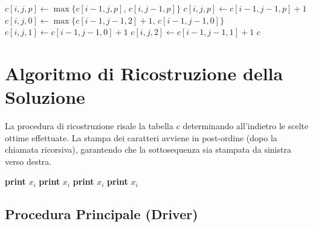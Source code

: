 \begin{algorithm}[H]
\begin{algorithmic}[1]
                \State $c[i, j, p] \gets \max\{ c[i-1, j, p], \, c[i, j-1, p] \}$
            \EndFor
        \Else {}
                    \State $c[i, j, p] \gets c[i-1, j-1, p] + 1$
                \EndFor
            \Else {}
                \State $c[i, j, 0] \gets \max\{ c[i-1, j-1, 2] + 1, \, c[i-1, j-1, 0] \}$
                \State $c[i, j, 1] \gets c[i-1, j-1, 0] + 1$
                \State $c[i, j, 2] \gets c[i-1, j-1, 1] + 1$
            \EndIf
        \EndIf
    \EndFor
\EndFor
\State \Return $c$
\EndProcedure
\end{algorithmic}
\end{algorithm}\section{Algoritmo di Ricostruzione della Soluzione}La procedura di ricostruzione risale la tabella $c$ determinando all'indietro le scelte ottime effettuate. La stampa dei caratteri avviene in post-ordine (dopo la chiamata ricorsiva), garantendo che la sottosequenza sia stampata da sinistra verso destra.\begin{algorithm}[H]
\caption{Ricostruzione Ricorsiva della LCS vincolata}
\begin{algorithmic}[1]
\State \Return
\EndIf{}
        \State {}
    \Else
        \State {}
    \EndIf
\Else {}
        \State {}
        \State \textbf{print} $x_i$
    \Else {}
                \State {}
                \State \textbf{print} $x_i$
            \Else
                \State {}
            \EndIf
            \State {}
            \State \textbf{print} $x_i$
            \State {}
            \State \textbf{print} $x_i$
        \EndIf
    \EndIf
\EndIf
\EndProcedure
\end{algorithmic}
\end{algorithm}\subsection{Procedura Principale (Driver)}
